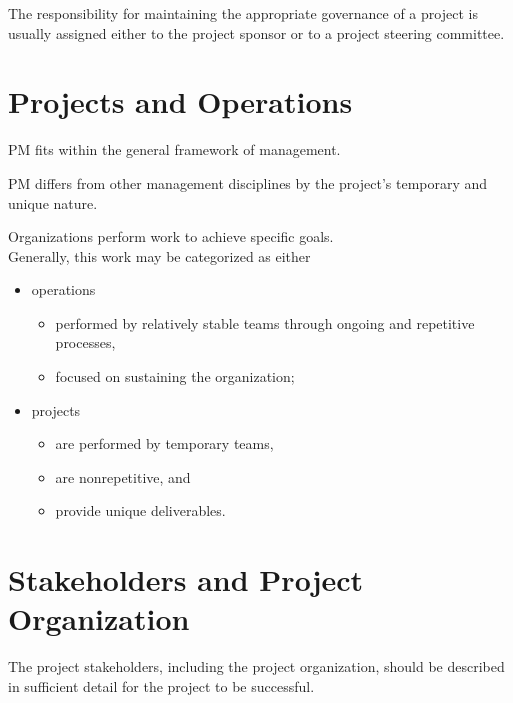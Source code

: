 \documentclass[letterpaper,10pt,english]{jupyterBook}
\begin{document}
\sphinxAtStartPar
The responsibility for maintaining the appropriate governance of a project is usually assigned either to the project sponsor or to a project steering committee.


\section{Projects and Operations}
\label{\detokenize{PM/pm-concepts:projects-and-operations}}
\sphinxAtStartPar
PM fits within the general framework of management.

\sphinxAtStartPar
PM differs from other management disciplines by the project’s temporary and unique nature.

\sphinxAtStartPar
Organizations perform work to achieve specific goals. \\
Generally, this work may be categorized as either
\begin{itemize}
\item {} 
\sphinxAtStartPar
operations
\begin{itemize}
\item {} 
\sphinxAtStartPar
performed by relatively stable teams through ongoing and repetitive processes,

\item {} 
\sphinxAtStartPar
focused on sustaining the organization;

\end{itemize}

\item {} 
\sphinxAtStartPar
projects
\begin{itemize}
\item {} 
\sphinxAtStartPar
are performed by temporary teams,

\item {} 
\sphinxAtStartPar
are non\sphinxhyphen{}repetitive, and

\item {} 
\sphinxAtStartPar
provide unique deliverables.

\end{itemize}

\end{itemize}


\section{Stakeholders and Project Organization}
\label{\detokenize{PM/pm-concepts:stakeholders-and-project-organization}}
\sphinxAtStartPar
The project stakeholders, including the project organization, should be described in sufficient detail for the project to be successful.
\end{document}
